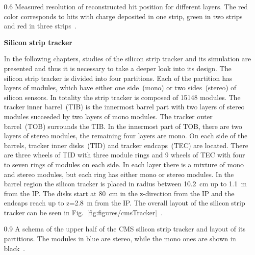                  {0.6}       
                 {Measured resolution of reconstructed hit position for different layers. The red color corresponds to hits with charge deposited in one strip, green in two strips and red in three strips~\cite{website:hitEff}. }


\textbf{Silicon strip tracker}


In the following chapters, studies of the silicon strip tracker and its simulation are presented and thus it is necessary to take a deeper look into its design. The silicon strip tracker is divided into four partitions. Each of the partition has layers of modules, which have either one side~(mono) or two sides~(stereo) of silicon sensors. In totality the strip tracker is composed of 15148 modules. The tracker inner barrel~(TIB) is the innermost barrel part with two layers of stereo modules succeeded by two layers of mono modules. The tracker outer barrel~(TOB) surrounds the TIB. In the innermost part of TOB, there are two layers of stereo modules, the remaining four layers are mono. On each side of the barrels, tracker inner disks~(TID) and tracker endcaps~(TEC) are located. There are three wheels of TID with three module rings and 9 wheels of TEC with four to seven rings of modules on each side. In each layer there is a mixture of mono and stereo modules, but each ring has either mono or stereo modules. In the barrel region the silicon tracker is placed in radius between 10.2~cm up to 1.1~m from the IP. The disks start at 80~cm in the z-direction from the IP and the endcaps reach up to z=2.8~m from the IP. The overall layout of the silicon strip tracker can be seen in Fig.~\ref{fig:figures/cmsTracker}~\cite{Chatrchyan:2014fea}.

                 {0.9}       
                 {A schema of the upper half of the CMS silicon strip tracker and layout of its partitions. The modules in blue are stereo, while the mono ones are shown in black~\cite{Chatrchyan:2014fea}. }


